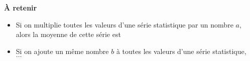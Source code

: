 \documentclass[a4paper]{article}
\begin{document}
\vspace{1cm}

\textbf{À retenir}

\begin{itemize}
  \item Si on multiplie toutes les valeurs d'une série statistique par un nombre $a$, alors la moyenne de cette série est \dotfill{}
  \item Si on ajoute un même nombre $b$ à toutes les valeurs d'une série statistique, \dotfill\\
    $\hdots$\dotfill
\end{itemize}
\end{document}
